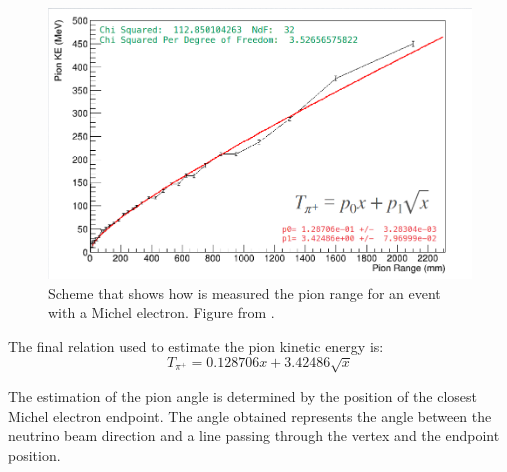 \begin{figure}[!htb]
    \centering
    \includegraphics[scale=0.33]{Figures/Chapter2/PionEstimator.png}
    \caption{Scheme that shows how is measured the pion range for an event with a Michel electron. Figure from \cite{TpiEstimator}. }
    \label{fig:MnvExp:MnvDetector:DataReconstruction:Untrackedpions:PionEstimator}
\end{figure}

The final relation used to estimate the pion kinetic energy is:
\begin{equation}
    T_{\pi^+} = 0.128706 x+ 3.42486 \sqrt{x}
\end{equation}

The estimation of the pion angle is determined by the position of the closest Michel electron endpoint. The angle obtained represents the angle between the neutrino beam direction and a line passing through the vertex and the endpoint position. 

